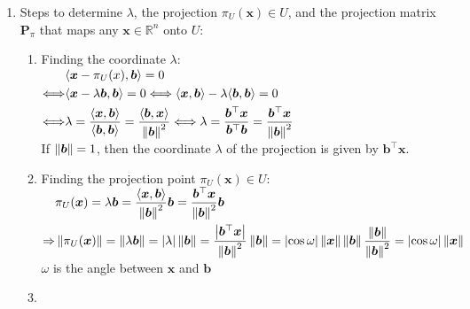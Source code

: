 \begin{enumerate}
    \item Steps to determine $\lambda$, the projection $\pi _U (\bm{x}) \in  U$, and the projection matrix $\bm{P}_ \pi $ that maps any $\bm{x} \in  \mathbb{R}^n$ onto $U$:
    \hfill \cite{mfml/book/mml/Deisenroth-Faisal-Ong}
    \begin{enumerate}
        \item Finding the coordinate $\lambda $:
        \hfill \cite{mfml/book/mml/Deisenroth-Faisal-Ong}
        \\
        $
            \begin{aligned}
                & \langle\bm{x} - \pi_ U (x), \bm{b}\rangle = 0 
                \\
                \Longleftrightarrow &
                    \langle\bm{x} - \lambda \bm{b}, \bm{b}\rangle = 0
                    \Longleftrightarrow 
                    \langle\bm{x}, \bm{b}\rangle - \lambda  \langle\bm{b}, \bm{b}\rangle = 0 
                \\
                \Longleftrightarrow &
                    \lambda  
                    = \dfrac{\langle\bm{x}, \bm{b}\rangle}{\langle\bm{b}, \bm{b}\rangle} 
                    = \dfrac{\langle\bm{b}, \bm{x}\rangle}{\left\| \bm{b} \right\|^2}
                    \Longleftrightarrow 
                    \lambda 
                    =\dfrac{\bm{b}^\top \bm{x}}{\bm{b}^\top \bm{b}}
                    =\dfrac{\bm{b}^\top \bm{x}}{\left\| \bm{b} \right\|^2}
            \end{aligned}
        $
        \hfill \cite{mfml/book/mml/Deisenroth-Faisal-Ong}
        \\
        If $\left\| \bm{b} \right\| = 1$, then the coordinate $\lambda$ of the projection is given by $\bm{b}^\top \bm{x}$.
        \hfill \cite{mfml/book/mml/Deisenroth-Faisal-Ong}

        \item Finding the projection point $\pi_U (\bm{x}) \in U$:
        \hfill \cite{mfml/book/mml/Deisenroth-Faisal-Ong}
        \\
        $
            \begin{aligned}
                & \pi _U (\bm{x}) = \lambda  \bm{b} 
                    = \dfrac{\langle\bm{x}, \bm{b}\rangle}{\left\| \bm{b} \right\|^2} \bm{b} 
                    = \dfrac{\bm{b}^\top \bm{x}}{\left\| \bm{b} \right\|^2} \bm{b} 
                \\
                \Rightarrow &
                    \left\| \pi _U (\bm{x}) \right\| = \left\| \lambda  \bm{b} \right\| = \left| \lambda \right| \left\| \bm{b} \right\| 
                    = \dfrac{\left| \bm{b}^\top \bm{x} \right|}{\left\| \bm{b} \right\|^2} \left\| \bm{b} \right\|
                    = \left| \cos \omega \right| \left\| \bm{x} \right\| \left\| \bm{b} \right\| \dfrac{\left\| \bm{b} \right\|}{\left\| \bm{b} \right\|^2}
                    = \left| \cos \omega \right| \left\| \bm{x} \right\| 
            \end{aligned}
        $
        \\
        $\omega$ is the angle between $\bm{x}$ and $\bm{b}$
        \hfill \cite{mfml/book/mml/Deisenroth-Faisal-Ong}

        \item 
        \hfill \cite{mfml/book/mml/Deisenroth-Faisal-Ong}
    \end{enumerate}
\end{enumerate}
